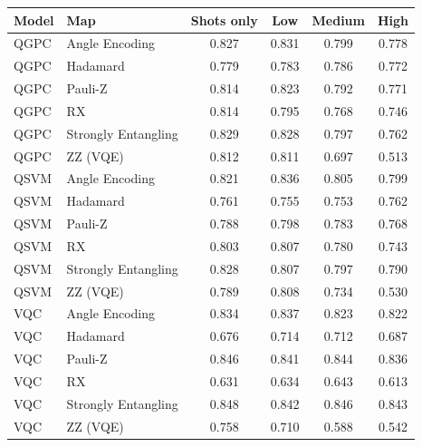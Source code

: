 \begin{tabular}{llcccc}
\toprule
Model & Map & Shots only & Low & Medium & High \\
\midrule
QGPC & Angle Encoding & 0.827 & 0.831 & 0.799 & 0.778 \\
QGPC & Hadamard & 0.779 & 0.783 & 0.786 & 0.772 \\
QGPC & Pauli-Z & 0.814 & 0.823 & 0.792 & 0.771 \\
QGPC & RX & 0.814 & 0.795 & 0.768 & 0.746 \\
QGPC & Strongly Entangling & 0.829 & 0.828 & 0.797 & 0.762 \\
QGPC & ZZ (VQE) & 0.812 & 0.811 & 0.697 & 0.513 \\
QSVM & Angle Encoding & 0.821 & 0.836 & 0.805 & 0.799 \\
QSVM & Hadamard & 0.761 & 0.755 & 0.753 & 0.762 \\
QSVM & Pauli-Z & 0.788 & 0.798 & 0.783 & 0.768 \\
QSVM & RX & 0.803 & 0.807 & 0.780 & 0.743 \\
QSVM & Strongly Entangling & 0.828 & 0.807 & 0.797 & 0.790 \\
QSVM & ZZ (VQE) & 0.789 & 0.808 & 0.734 & 0.530 \\
VQC & Angle Encoding & 0.834 & 0.837 & 0.823 & 0.822 \\
VQC & Hadamard & 0.676 & 0.714 & 0.712 & 0.687 \\
VQC & Pauli-Z & 0.846 & 0.841 & 0.844 & 0.836 \\
VQC & RX & 0.631 & 0.634 & 0.643 & 0.613 \\
VQC & Strongly Entangling & 0.848 & 0.842 & 0.846 & 0.843 \\
VQC & ZZ (VQE) & 0.758 & 0.710 & 0.588 & 0.542 \\
\bottomrule
\end{tabular}
